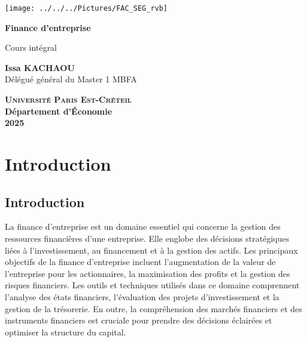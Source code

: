 \documentclass[a4paper, 12pt]{report}
\begin{document}
	
	
\begin{titlepage}
	\centering
	\begin{center}
		\texttt{[image: ../../../Pictures/FAC\_SEG\_rvb]}
	\end{center}
	\vspace*{2cm}
	
	\Huge
	
	\textbf{Finance d'entreprise}
	\vspace{1.5cm}
	
	\Large
	Cours intégral
	
	\vspace{2cm}
	
	\textbf{Issa KACHAOU} \\
	{\normalsize Délégué général du Master 1 MBFA}
	
	
	\vfill
	
	\Large
	
	\textsc{\textbf{Université Paris Est-Créteil}}	 \\
	\textbf{Département d'\'Economie} \\
	\textbf{2025}
	
\end{titlepage}
\thispagestyle{empty}
\newpage
\clearpage
\mbox{}
\thispagestyle{empty}

\tableofcontents

\thispagestyle{empty}
\newpage
\mbox{}
\thispagestyle{empty} %
	

\chapter*{Introduction}	

\section{Introduction}

La finance d'entreprise est un domaine essentiel qui concerne la gestion des ressources financières d'une entreprise. Elle englobe des décisions stratégiques liées à l'investissement, au financement et à la gestion des actifs. Les principaux objectifs de la finance d'entreprise incluent l'augmentation de la valeur de l'entreprise pour les actionnaires, la maximisation des profits et la gestion des risques financiers. Les outils et techniques utilisés dans ce domaine comprennent l'analyse des états financiers, l'évaluation des projets d'investissement et la gestion de la trésorerie. En outre, la compréhension des marchés financiers et des instruments financiers est cruciale pour prendre des décisions éclairées et optimiser la structure du capital.
\end{document}
